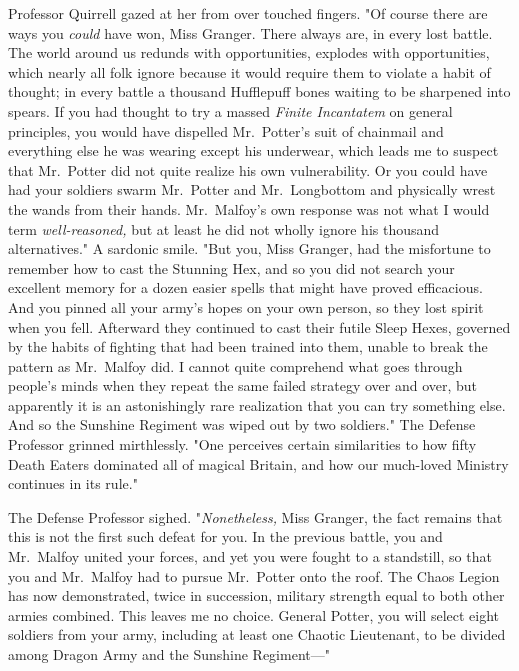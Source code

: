 Professor Quirrell gazed at her from over touched fingers. "Of course there are 
ways you \emph{could} have won, Miss Granger. There always are, in every lost 
battle. The world around us redunds with opportunities, explodes with 
opportunities, which nearly all folk ignore because it would require them to 
violate a habit of thought; in every battle a thousand Hufflepuff bones waiting 
to be sharpened into spears. If you had thought to try a massed \emph{Finite 
Incantatem} on general principles, you would have dispelled Mr.~Potter's suit 
of chainmail and everything else he was wearing except his underwear, which 
leads me to suspect that Mr.~Potter did not quite realize his own 
vulnerability. Or you could have had your soldiers swarm Mr.~Potter and 
Mr.~Longbottom and physically wrest the wands from their hands. Mr.~Malfoy's 
own response was not what I would term \emph{well-reasoned,} but at least he 
did not wholly ignore his thousand alternatives." A sardonic smile. "But you, 
Miss Granger, had the misfortune to remember how to cast the Stunning Hex, and 
so you did not search your excellent memory for a dozen easier spells that 
might have proved efficacious. And you pinned all your army's hopes on your own 
person, so they lost spirit when you fell. Afterward they continued to cast 
their futile Sleep Hexes, governed by the habits of fighting that had been 
trained into them, unable to break the pattern as Mr.~Malfoy did. I cannot 
quite comprehend what goes through people's minds when they repeat the same 
failed strategy over and over, but apparently it is an astonishingly rare 
realization that you can try something else. And so the Sunshine Regiment was 
wiped out by two soldiers." The Defense Professor grinned mirthlessly. "One 
perceives certain similarities to how fifty Death Eaters dominated all of 
magical Britain, and how our much-loved Ministry continues in its rule."

The Defense Professor sighed. "\emph{Nonetheless,} Miss Granger, the fact 
remains that this is not the first such defeat for you. In the previous battle, 
you and Mr.~Malfoy united your forces, and yet you were fought to a standstill, 
so that you and Mr.~Malfoy had to pursue Mr.~Potter onto the roof. The Chaos 
Legion has now demonstrated, twice in succession, military strength equal to 
both other armies combined. This leaves me no choice. General Potter, you will 
select eight soldiers from your army, including at least one Chaotic 
Lieutenant, to be divided among Dragon Army and the Sunshine Regiment---"

